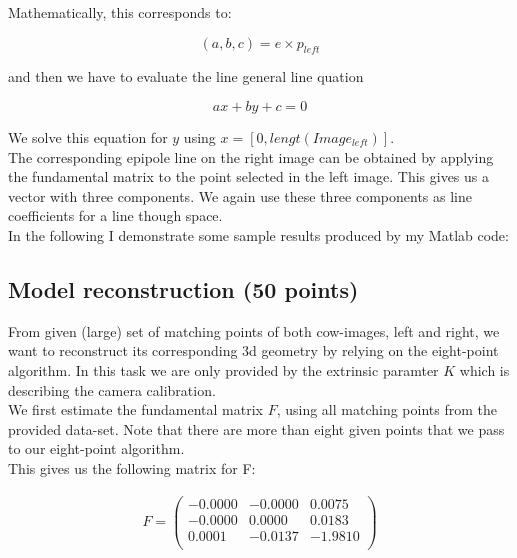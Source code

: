 \documentclass{paper}
\begin{document}
Mathematically, this corresponds to:

\begin{equation}
    (a,b,c) = e \times p_{left}
\end{equation}

and then we have to evaluate the line general line quation 

\begin{equation}
    ax + by + c = 0
\end{equation}

We solve this equation for $y$ using $x = [0,lengt(Image_{left})]$. \\

The corresponding epipole line on the right image can be obtained by applying the fundamental matrix to the point selected in the left image. This gives us a vector with three components. We again use these three components as line coefficients for a line though space. \\

In the following I demonstrate some sample results produced by my Matlab code:






 




\subsection{Model reconstruction (50 points)}

From given (large) set of matching points of both cow-images, left and right, we want to reconstruct its corresponding 3d geometry by relying on the eight-point algorithm. In this task we are only provided by the extrinsic paramter $K$ which is describing the camera calibration. \\

We first estimate the fundamental matrix $F$, using all matching points from the provided data-set. Note that there are more than eight given points that we pass to our eight-point algorithm. \\

This gives us the following matrix for F:

\begin{align}
F = 
\left(\begin{array}{rrr}
   -0.0000  & -0.0000 &   0.0075 \\
   -0.0000  &  0.0000 &   0.0183 \\
    0.0001  & -0.0137 &  -1.9810 \\
\end{array} \right)
\end{align}
\end{document}
